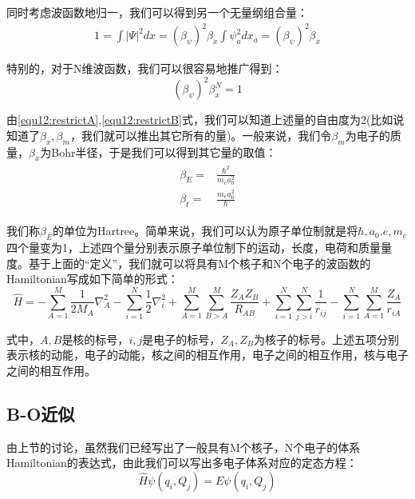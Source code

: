         同时考虑波函数地归一，我们可以得到另一个无量纲组合量：
        \begin{align}\label{equ12:restrictB}
                1=\int |\Psi|^2dx=(\beta_{\psi})^2\beta_x\int \psi^2_adx_a=(\beta_{\psi})^2\beta_x
        \end{align}
        
        特别的，对于N维波函数，我们可以很容易地推广得到：
        \begin{equation}
            (\beta_{\psi})^2\beta_x^N=1
        \end{equation}
        
        由\ref{equ12:restrictA},\ref{equ12:restrictB}式，我们可以知道上述量的自由度为2(比如说知道了$\beta_x,\beta_m$，我们就可以推出其它所有的量)。一般来说，我们令$\beta_m$为电子的质量，$\beta_x$为Bohr半径，于是我们可以得到其它量的取值：
       \begin{align}
           \begin{split}
               \beta_E=&\frac{\hbar^2}{m_ea_0^2}\\
               \beta_t=&\frac{m_ea_0^2}{\hbar}
           \end{split}
       \end{align}
       
       我们称$\beta_E$的单位为Hartree。简单来说，我们可以认为原子单位制就是将$\hbar,a_0.e,m_e$四个量变为1，上述四个量分别表示原子单位制下的运动，长度，电荷和质量量度。基于上面的“定义”，我们就可以将具有M个核子和N个电子的波函数的Hamiltonian写成如下简单的形式：
       \begin{equation}
           \hat{H}=-\sum_{A=1}^M\frac{1}{2M_A}\nabla^2_A-\sum_{i=1}^N\frac{1}{2}\nabla_i^2+\sum_{A=1}^{M}\sum_{B>A}^M\frac{Z_AZ_B}{R_{AB}}+\sum_{i=1}^{N}\sum_{j>i}^N\frac{1}{r_{ij}}-\sum_{i=1}^N\sum_{A=1}^M\frac{Z_A}{r_{iA}}
       \end{equation}
       
       式中，$A,B$是核的标号，$i,j$是电子的标号，$Z_A,Z_B$为核子的标号。上述五项分别表示核的动能，电子的动能，核之间的相互作用，电子之间的相互作用，核与电子之间的相互作用。
    \subsection{B-O近似}
        由上节的讨论，虽然我们已经写出了一般具有M个核子，N个电子的体系Hamiltonian的表达式，由此我们可以写出多电子体系对应的定态方程：
        \begin{equation}\label{equ12:multiele_stationaryA}
            \hat{H}\psi(q_i,Q_j)=E\psi(q_i,Q_j)
        \end{equation}
        
